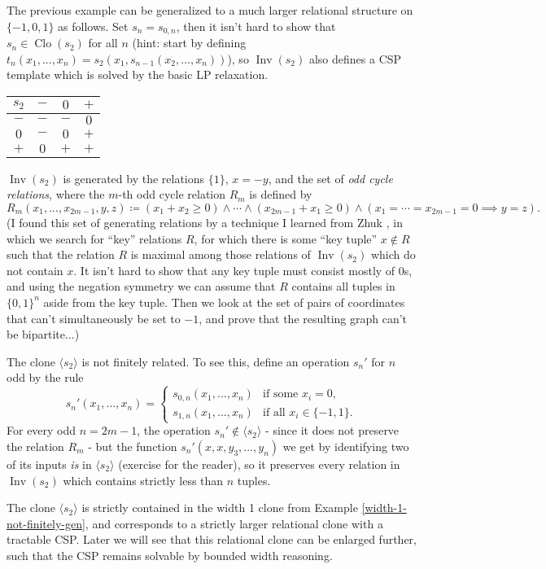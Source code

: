 \documentclass[letterpaper,11pt]{article}
\DeclareMathOperator{\Clo}{Clo}
\DeclareMathOperator{\Inv}{Inv}
\begin{document}
\begin{ex}\label{lp-not-width-1} The previous example can be generalized to a much larger relational structure on $\{-1,0,1\}$ as follows. Set $s_n = s_{0,n}$, then it isn't hard to show that $s_n \in \Clo(s_2)$ for all $n$ (hint: start by defining $t_n(x_1, ..., x_n) = s_2(x_1,s_{n-1}(x_2, ..., x_n))$), so $\Inv(s_2)$ also defines a CSP template which is solved by the basic LP relaxation.

\begin{center}
\begin{tabular}{c|ccc} $s_2$ & $-$ & $0$ & $+$\\ \hline $-$ & $-$ & $-$ & $0$\\ $0$ & $-$ & $0$ & $+$\\ $+$ & $0$ & $+$ & $+$\end{tabular}
\end{center}

$\Inv(s_2)$ is generated by the relations $\{1\}$, $x = -y$, and the set of \emph{odd cycle relations}, where the $m$-th odd cycle relation $R_m$ is defined by
\[
R_m(x_1, ..., x_{2m-1},y,z) \coloneqq (x_1 + x_2 \ge 0) \wedge \cdots \wedge (x_{2m-1} + x_1 \ge 0) \wedge (x_1 = \cdots = x_{2m-1} = 0 \implies y = z).
\]
(I found this set of generating relations by a technique I learned from Zhuk \cite{zhuk-key}, in which we search for ``key'' relations $R$, for which there is some ``key tuple'' $x \not\in R$ such that the relation $R$ is maximal among those relations of $\Inv(s_2)$ which do not contain $x$. It isn't hard to show that any key tuple must consist mostly of $0$s, and using the negation symmetry we can assume that $R$ contains all tuples in $\{0,1\}^n$ aside from the key tuple. Then we look at the set of pairs of coordinates that can't simultaneously be set to $-1$, and prove that the resulting graph can't be bipartite...)

The clone $\langle s_2 \rangle$ is not finitely related. To see this, define an operation $s_n'$ for $n$ odd by the rule
\[
s_n'(x_1, ..., x_n) = \begin{cases}s_{0,n}(x_1, ..., x_n) & \text{if some }x_i = 0,\\ s_{1,n}(x_1, ..., x_n) & \text{if all } x_i \in \{-1,1\}.\end{cases}
\]
For every odd $n = 2m-1$, the operation $s_n' \not\in \langle s_2 \rangle$ - since it does not preserve the relation $R_m$ - but the function $s_n'(x,x,y_3,...,y_n)$ we get by identifying two of its inputs \emph{is} in $\langle s_2 \rangle$ (exercise for the reader), so it preserves every relation in $\Inv(s_2)$ which contains strictly less than $n$ tuples.

The clone $\langle s_2 \rangle$ is strictly contained in the width 1 clone from Example \ref{width-1-not-finitely-gen}, and corresponds to a strictly larger relational clone with a tractable CSP. Later we will see that this relational clone can be enlarged further, such that the CSP remains solvable by bounded width reasoning.
\end{ex}
\end{document}
